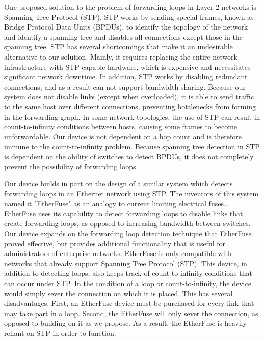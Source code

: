\documentclass{article}
\begin{document}
\begin{multicols}{2}
	One proposed solution to the problem of forwarding loops in Layer 2 networks is Spanning Tree Protocol (STP).
	STP works by sending special frames, known as Bridge Protocol Data Units (BPDUs), to identify the topology of the network and identify a spanning tree and disables all connections except those in the spanning tree.
	STP has several shortcomings that make it an undesirable alternative to our solution.
	Mainly, it requires replacing the entire network infrastructure with STP-capable hardware, which is expensive and necessitates significant network downtime.
	In addition, STP works by disabling redundant connections, and as a result can not support bandwidth sharing.
	Because our system does not disable links (except when overloaded), it is able to send traffic to the same host over different connections, preventing bottlenecks from forming in the forwarding graph.
  In some network topologies, the use of STP can result in count-to-infinity conditions between hosts, causing some frames to become unforwardable.
  Our device is not dependent on a hop count and is therefore immune to the count-to-infinity problem.
	Because spanning tree detection in STP is dependent on the ability of switches to detect BPDUs, it does not completely prevent the possibility of forwarding loops.
	
	Our device builds in part on the design of a similar system which detects forwarding loops in an Ethernet network using STP.
	The inventors of this system named it "EtherFuse" as an analogy to current limiting electrical fuses.\cite{etherfuse}.
	EtherFuse uses its capability to detect forwarding loops to disable links that create forwarding loops, as opposed to increasing bandwidth between switches.
	Our device expands on the forwarding loop detection technique that EtherFuse proved effective, but provides additional functionality that is useful for administrators of enterprise networks.
	EtherFuse is only compatible with networks that already support Spanning Tree Protocol (STP).
	This device, in addition to detecting loops, also keeps track of count-to-infinity conditions that can occur under STP.
	In the condition of a loop or count-to-infinity, the device would simply sever the connection on which it is placed.
	This has several disadvantages.
	First, an EtherFuse device must be purchased for every link that may take part in a loop.
	Second, the EtherFuse will only sever the connection, as opposed to building on it as we propose.
	As a result, the EtherFuse is heavily reliant on STP in order to function.
	

\end{multicols}
\end{document}
